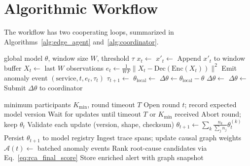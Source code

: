 \section{Algorithmic Workflow}
\label{sec:method_algorithms}

The workflow has two cooperating loops, summarized in
Algorithms~\ref{alg:edge_agent} and~\ref{alg:coordinator}.

\begin{algorithm}[H]
\caption{Edge Agent Loop}
\label{alg:edge_agent}
\begin{algorithmic}[1]
\Require global model $\theta$, window size $W$, threshold $\tau$
\Loop
    \State $x_t \gets$ 
    \State $x'_t \gets$ 
    \State Append $x'_t$ to window buffer
        \State $X_t \gets$ last $W$ observations
        \State $e_t \gets \frac{1}{WF}\|X_t - \text{Dec}(\text{Enc}(X_t))\|^2$
            \State Emit anomaly event $(\text{service}, t, e_t, \tau_t)$
        \EndIf
            \State $\tau_{t+1} \gets$ 
        \EndIf
    \EndIf
        \State $\theta_{\text{local}} \gets$ 
        \State $\Delta\theta \gets \theta_{\text{local}} - \theta$
        \State $\Delta\theta \gets$ 
        \State $\Delta\theta \gets$ 
        \State Submit $\Delta\theta$ to coordinator
    \EndIf
\EndLoop
\end{algorithmic}
\end{algorithm}

\begin{algorithm}[H]
\caption{Coordinator Loop}
\label{alg:coordinator}
\begin{algorithmic}[1]
\Require minimum participants $K_{\min}$, round timeout $T$
\Loop
    \State Open round $t$; record expected model version
    \State Wait for updates until timeout $T$ or $K_{\min}$ received
        \State Abort round; keep $\theta_t$
    \Else
        \State Validate each update (version, shape, checksum)
        \State $\theta_{t+1} \gets \sum_{k} \frac{n_k}{\sum_j n_j} \theta_t^{(k)}$ 
        \State Persist $\theta_{t+1}$ to model registry
    \EndIf
    \State Ingest trace spans; update causal graph weights
        \State $\mathcal{A}(t) \gets$ batched anomaly events
        \State Rank root-cause candidates via Eq.~\ref{eq:rca_final_score}
        \State Store enriched alert with graph snapshot
    \EndIf
\EndLoop
\end{algorithmic}
\end{algorithm}

